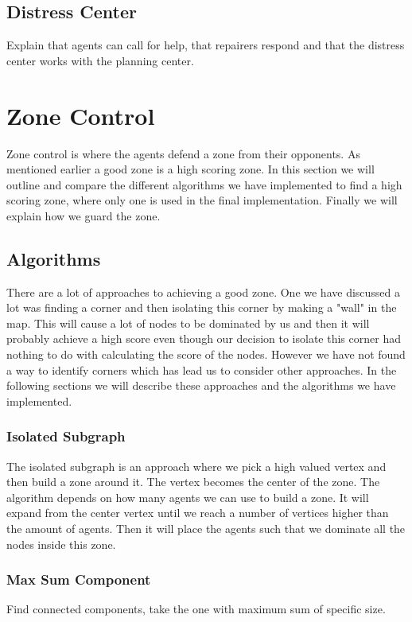 \documentclass[11pt]{article}
\begin{document}
\subsection{Distress Center}
Explain that agents can call for help, that repairers respond and that the distress center works with the planning center.

\section{Zone Control}
Zone control is where the agents defend a zone from their opponents. As mentioned earlier a good zone is a high scoring zone. In this section we will outline and compare the different algorithms we have implemented to find a high scoring zone, where only one is used in the final implementation. Finally we will explain how we guard the zone.

\subsection{Algorithms}
There are a lot of approaches to achieving a good zone. One we have discussed a lot was finding a corner and then isolating this corner by making a "wall" in the map. This will cause a lot of nodes to be dominated by us and then it will probably achieve a high score even though our decision to isolate this corner had nothing to do with calculating the score of the nodes. However we have not found a way to identify corners which has lead us to consider other approaches. In the following sections we will describe these approaches and the algorithms we have implemented.

\subsubsection{Isolated Subgraph}
The isolated subgraph is an approach where we pick a high valued vertex and then build a zone around it. The vertex becomes the center of the zone. The algorithm depends on how many agents we can use to build a zone. It will expand from the center vertex until we reach a number of vertices higher than the amount of agents. Then it will place the agents such that we dominate all the nodes inside this zone.

\subsubsection{Max Sum Component}
Find connected components, take the one with maximum sum of specific size.
\end{document}
